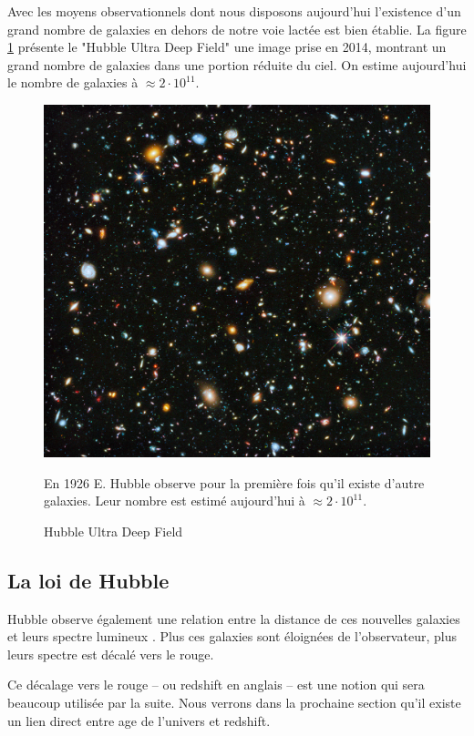 Avec les moyens observationnels dont nous disposons aujourd'hui l’existence d'un grand nombre de galaxies en dehors de notre voie lactée est bien établie.
La figure \ref{fig:hubbl_deep_field} présente le "Hubble Ultra Deep Field" \citep{1538-3881-132-5-1729} une image prise en 2014, montrant un grand nombre de galaxies dans une portion réduite du ciel.
On estime aujourd'hui le nombre de galaxies à $\approx 2 \cdot 10^{11}$.


\begin{figure}[bth]
        \includegraphics[width=.9\linewidth]{img/01/hudf.jpeg} 
        \caption{Hubble Ultra Deep Field} 
		En 1926 E. Hubble observe pour la première fois qu'il existe d'autre galaxies.
		Leur nombre est estimé aujourd'hui à $\approx 2 \cdot 10^{11}$.
 		\label{fig:hubbl_deep_field}
\end{figure}

\subsection{La loi de Hubble}
Hubble observe également une relation entre la distance de ces nouvelles galaxies et leurs spectre lumineux \citep{1929CoMtW...3...23H}.
Plus ces galaxies sont éloignées de l'observateur, plus leurs spectre est décalé vers le rouge.

Ce décalage vers le rouge -- ou redshift en anglais -- est une notion qui sera beaucoup utilisée par la suite.
Nous verrons dans la prochaine section qu'il existe un lien direct entre age de l'univers et redshift.


